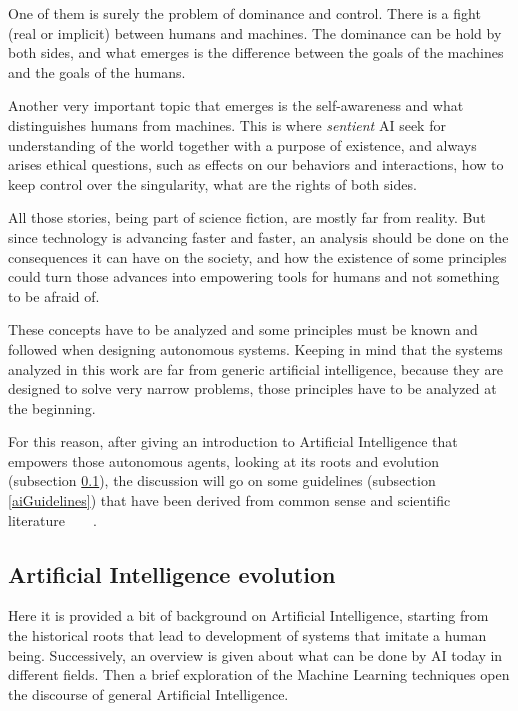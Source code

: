 One of them is surely the problem of dominance and control. There is a fight (real or implicit) between humans and machines. The dominance can be hold by both sides, and what emerges is the difference between the goals of the machines and the goals of the humans.

Another very important topic that emerges is the self-awareness and what distinguishes humans from machines. This is where \textit{sentient} AI seek for understanding of the world together with a purpose of existence, and always arises ethical questions, such as effects on our behaviors and interactions, how to keep control over the singularity, what are the rights of both sides.

All those stories, being part of science fiction, are mostly far from reality. But since technology is advancing faster and faster, an analysis should be done on the consequences it can have on the society, and how the existence of some principles could turn those advances into empowering tools for humans and not something to be afraid of.

These concepts have to be analyzed and some principles must be known and followed when designing autonomous systems. Keeping in mind that the systems analyzed in this work are far from generic artificial intelligence, because they are designed to solve very narrow problems, those principles have to be analyzed at the beginning.

For this reason, after giving an introduction to Artificial Intelligence that empowers those autonomous agents, looking at its roots and evolution (subsection \ref{aiEvolution}), the discussion will go on some guidelines (subsection \ref{aiGuidelines}) that have been derived from common sense and scientific literature~\cite{walsh2016turing}~\cite{hibbard2014ethical}~\cite{moor2009four}~\cite{clarke2011asimov}.

\subsection{Artificial Intelligence evolution}
\label{aiEvolution}

Here it is provided a bit of background on Artificial Intelligence, starting from the historical roots that lead to development of systems that imitate a human being. Successively, an overview is given about what can be done by AI today in different fields. Then a brief exploration of the Machine Learning techniques open the discourse of general Artificial Intelligence.

